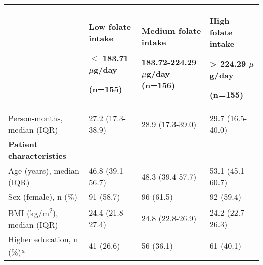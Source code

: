 \begin{flushleft}
\small
{}
\label{table6_1}
\tablehead{}
\begin{supertabular}{m{4.795cm}m{3.5cm}m{3.5cm}m{3.3cm}}
\hline
~
 &
{\bfseries Low folate intake}

{\bfseries ${\leq}$ 183.71
$\mu$g/day}

\bfseries (n=155) &
{\bfseries Medium folate intake}

\bfseries 183.72-224.29 $\mu$g/day
(n=156) &
{\bfseries High folate intake}

{\bfseries {\textgreater} 224.29
$\mu$g/day}

\bfseries (n=155)\\\hline
 Person-months, median (IQR) &
 27.2 (17.3-38.9) &
 28.9 (17.3-39.0) &
 29.7 (16.5-40.0)\\\hline
\bfseries Patient characteristics &
~
 &
~
 &
~
\\\hline
{Age (years),
median (IQR)} &
 46.8 (39.1-56.7) &
 48.3 (39.4-57.7) &
 53.1 (45.1-60.7)\\
 Sex (female), n (\%) &
 91 (58.7) &
 96 (61.5) &
 92 (59.4)\\
 {BMI
(kg/m}{\textsuperscript{2}}{),
median (IQR)} &
 24.4 (21.8-27.4) &
 24.8 (22.8-26.9) &
 24.2 (22.7-26.3)\\
{Higher
education, n
(\%)}{\textit{\textsuperscript{a}}} &
 41 (26.6) &
 56 (36.1) &
 61 (40.1)\\\hline


\end{supertabular}
\end{flushleft}
